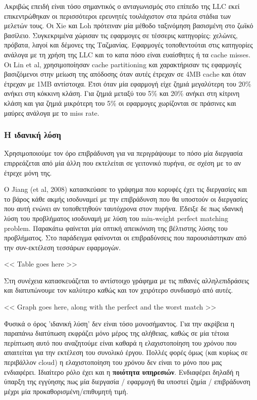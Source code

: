 Ακριβώς επειδή είναι τόσο σημαντικός ο ανταγωνισμός στο επίπεδο της LLC εκεί
επικεντρώθηκαν οι περισσότεροι ερευνητές τουλάχιστον στα πρώτα στάδια των
μελετών τους. Οι Xie και Loh πρότειναν μία μέθοδο ταξινόμηση βασισμένη στο ζωϊκό
βασίλειο. Συγκεκριμένα χώρισαν τις εφαρμογες σε τέσσερις κατηγορίες: χελώνες,
πρόβατα, λαγοί και δέμονες της Ταζμανίας. Εφαρμογές τοποθεντούται στις
κατηγορίες ανάλογα με τη χρήση της LLC και το κατα πόσο είναι ευαίσθητες ή τα
cache misses. Οι Lin et al, χρησιμοποίησαν cache partitioning και χαρακτήρισαν
τις εφαρμογές βασιζόμενοι στην μείωση της απόδοσης όταν αυτές έτρεχαν σε 4ΜΒ
cache και όταν έτρεχαν με 1ΜΒ αντίστοιχα. Έτσι όταν μία εφαρμογή είχε ζημιά
μεγαλύτερη του 20\% ανήκει στη κόκκινη κλάση. Για ζημιά μεταξύ του 5\% και 20\%
ανήκει στη κίτρινη κλάση και για ζημιά μικρότερη του 5\% οι εφαρμογες χωρίζονται
σε πράσινες και μαύρες ανάλογα με το miss rate.

\subsubsection{Η ιδανική λύση}
Χρησιμοποιούμε τον όρο επιβράδυνση για να περιγράψουμε το πόσο μία διεργασία
επιρρεάζεται από μία άλλη που εκτελείται σε γειτονικό πυρήνα, σε σχέση με το αν
έτρεχε μόνη της.

Ο Jiang (et al, 2008) κατασκεύασε το γράφημα που κορυφές έχει τις διεργασίες και
το βάρος κάθε ακμής ισοδυναμεί με την επιβράδυνση που θα υποστούν οι διεργασίες
που αυτή ενώνει αν τοποθετηθούν ταυτόχρονα στον πυρήνα. Έδειξε δε πως ιδανική
λύση του προβλήματος ισοδυναμή με λύση του min-weight perfect matching problem.
Παρακάτω φαίνεται μία οπτική απεικόνιση της βέλτιστης λύσης του προβλήματος. Στο
παράδειγμα φαίνονται οι επιβραδύνσεις που παρουσιάστηκαν από την συν-εκτέλεση
τεσσάρων εφαρμογών.

<< Table goes here >>

Στη συνέχεια κατασκευάζεται το αντίστοιχο γράφημα με τις πιθανές αλληλεπιδράσεις
και διατυπώνουμε τον καλύτερο καθώς και τον χειρότερο συνδιασμό από αυτές.

<< Graph goes here, along with the perfect and the worst match >>

Φυσικά ο όρος 'ιδανική λύση' δεν είναι τόσο μονοσήμαντος. Για την ακρίβεια η
παραπάνω διατύπωση εκφράζει μόνο μέρος της αλήθειας, καθώς σε μία τέτοια
περίπτωση αυτό που αναζητούμε είναι καθαρά η ελαχιστοποίηση του χρόνου που
απαιτείται για την εκτέλεση του συνολικό έργου. Πολλές φορές όμως (και κυρίως σε
περιβάλλον cloud) η ελαχιστοποίηση του χρόνου δεν είναι το μόνο που μας
ενδιαφέρει. Ιδιαίτερο ρόλο έχει και η \textbf{ποιότητα υπηρεσιών}. Ενδιαφέρει
δηλαδή η ύπαρξη της εγγύησης πως μία διεργασία / εφαρμογή θα υποστεί ζημία /
επιβράδυνση μέχρι μία προκαθορισμένη/επιθυμητή τιμή.

